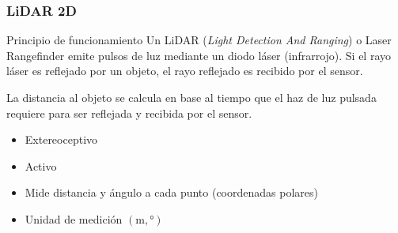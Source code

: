 \begin{frame}
    \frametitle{LiDAR 2D}
    
    \begin{figure}[!h]
        \centering
    \end{figure}

    \footnotesize
    \begin{block}{Principio de funcionamiento}
     Un LiDAR (\emph{Light Detection And Ranging}) o Laser Rangefinder emite pulsos de luz mediante un diodo láser (infrarrojo). Si el rayo láser es reflejado por un objeto, el rayo reflejado es recibido por el sensor.
     
     La distancia al objeto se calcula en base al tiempo que el haz de luz pulsada requiere para ser reflejada y recibida por el sensor.
    \end{block}
    
    \begin{itemize}
        \item Extereoceptivo
        \item Activo
        \item Mide distancia y ángulo a cada punto (coordenadas polares)
        \item Unidad de medición $(\si{\meter},\si{\degree})$
    \end{itemize}


\end{frame}


